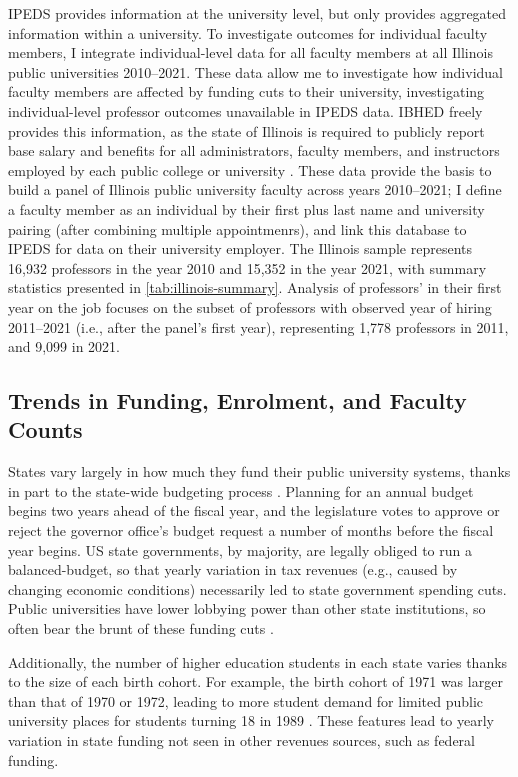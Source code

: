 IPEDS provides information at the university level, but only provides aggregated information within a university.
To investigate outcomes for individual faculty members, I integrate individual-level data for all faculty members at all Illinois public universities 2010--2021.
These data allow me to investigate how individual faculty members are affected by funding cuts to their university, investigating individual-level professor outcomes unavailable in IPEDS data.
IBHED freely provides this information, as the state of Illinois is required to publicly report base salary and benefits for all administrators, faculty members, and instructors employed by each public college or university \citep{illinois-public-act}.
These data provide the basis to build a panel of Illinois public university faculty across years 2010--2021; I define a faculty member as an individual by their first plus last name and university pairing (after combining multiple appointmenrs), and link this database to IPEDS for data on their university employer.
The Illinois sample represents 16,932 professors in the year 2010 and 15,352 in the year 2021, with summary statistics presented in \autoref{tab:illinois-summary}.
Analysis of professors' in their first year on the job focuses on the subset of professors with observed year of hiring 2011--2021 (i.e., after the panel's first year), representing 1,778 professors in 2011, and 9,099 in 2021.

\subsection{Trends in Funding, Enrolment, and Faculty Counts}
\label{sec:trends}

States vary largely in how much they fund their public university systems, thanks in part to the state-wide budgeting process \citep{NBERw23736}.
Planning for an annual budget begins two years ahead of the fiscal year, and the legislature votes to approve or reject the governor office's budget request a number of months before the fiscal year begins.
US state governments, by majority, are legally obliged to run a balanced-budget, so that yearly variation in tax revenues (e.g., caused by changing economic conditions) necessarily led to state government spending cuts.
Public universities have lower lobbying power than other state institutions, so often bear the brunt of these funding cuts \citep{delaney2011state}.

Additionally, the number of higher education students in each state varies thanks to the size of each birth cohort.
For example, the birth cohort of 1971 was larger than that of 1970 or 1972, leading to more student demand for limited public university places for students turning 18 in 1989 \citep{bound2007cohort}.
These features lead to yearly variation in state funding not seen in other revenues sources, such as federal funding.

